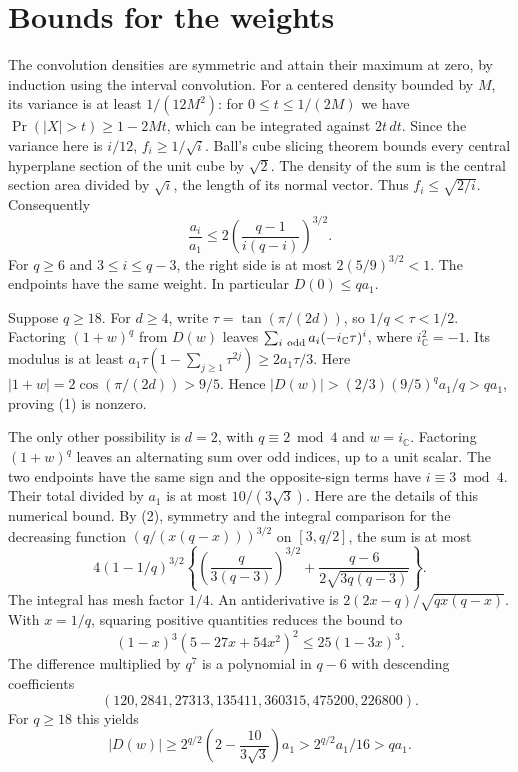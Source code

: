 \documentclass[11pt,letterpaper]{article}
\begin{document}
\section{Bounds for the weights}
The convolution densities are symmetric and attain their maximum at zero, by induction using the interval convolution. For a centered density bounded by \(M\), its variance is at least \(1/(12M^2)\): for \(0\le t\le1/(2M)\) we have \(\Pr(|X|>t)\ge1-2Mt\), which can be integrated against \(2t\,dt\). Since the variance here is \(i/12\), \(f_i\ge1/\sqrt i\). Ball's cube slicing theorem bounds every central hyperplane section of the unit cube by \(\sqrt2\). The density of the sum is the central section area divided by \(\sqrt i\), the length of its normal vector. Thus \(f_i\le\sqrt{2/i}\). Consequently
\[
 \frac{a_i}{a_1}\le2\left(\frac{q-1}{i(q-i)}\right)^{3/2}.
 \tag{2}
\]
For \(q\ge6\) and \(3\le i\le q-3\), the right side is at most \(2(5/9)^{3/2}<1\). The endpoints have the same weight. In particular \(D(0)\le q a_1\).

Suppose \(q\ge18\). For \(d\ge4\), write \(\tau=\tan(\pi/(2d))\), so \(1/q<\tau<1/2\). Factoring \((1+w)^q\) from \(D(w)\) leaves \(\sum_{i\ {\rm odd}}a_i(-i_{\mathbb C}\tau)^i\), where \(i_{\mathbb C}^2=-1\). Its modulus is at least \(a_1\tau(1-\sum_{j\ge1}\tau^{2j})\ge2a_1\tau/3\). Here \(|1+w|=2\cos(\pi/(2d))>9/5\). Hence \(|D(w)|>(2/3)(9/5)^q a_1/q>q a_1\), proving (1) is nonzero.

The only other possibility is \(d=2\), with \(q\equiv2\bmod4\) and \(w=i_{\mathbb C}\). Factoring \((1+w)^q\) leaves an alternating sum over odd indices, up to a unit scalar. The two endpoints have the same sign and the opposite-sign terms have \(i\equiv3\bmod4\). Their total divided by \(a_1\) is at most \(10/(3\sqrt3)\). Here are the details of this numerical bound. By (2), symmetry and the integral comparison for the decreasing function \((q/(x(q-x)))^{3/2}\) on \([3,q/2]\), the sum is at most
\[
 4(1-1/q)^{3/2}
 \left\{\left(\frac{q}{3(q-3)}\right)^{3/2}
       +\frac{q-6}{2\sqrt{3q(q-3)}}\right\}.
\]
The integral has mesh factor \(1/4\). An antiderivative is \(2(2x-q)/\sqrt{qx(q-x)}\). With \(x=1/q\), squaring positive quantities reduces the bound to
\[
 (1-x)^3(5-27x+54x^2)^2\le25(1-3x)^3.
\]
The difference multiplied by \(q^7\) is a polynomial in \(q-6\) with descending coefficients
\[
 (120,2841,27313,135411,360315,475200,226800).
\]
For \(q\ge18\) this yields
\[
 |D(w)|\ge 2^{q/2}\left(2-\frac{10}{3\sqrt3}\right)a_1
        > 2^{q/2}a_1/16 > q a_1 .
\]
\end{document}
